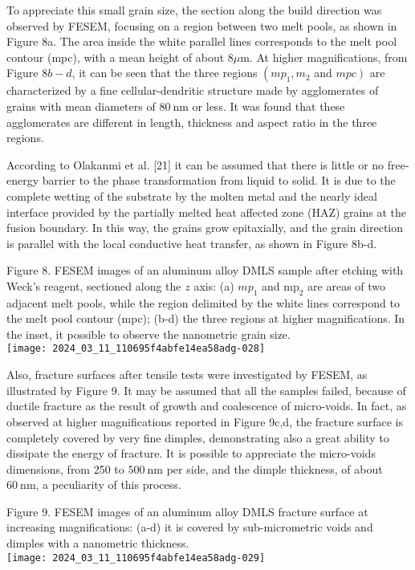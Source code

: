 \documentclass[10pt]{article}
\begin{document}
To appreciate this small grain size, the section along the build direction was observed by FESEM, focusing on a region between two melt pools, as shown in Figure 8a. The area inside the white parallel lines corresponds to the melt pool contour (mpc), with a mean height of about $8 \mu \mathrm{m}$. At higher magnifications, from Figure $8 b-d$, it can be seen that the three regions $\left(m p_{1}, m_{2}\right.$ and $\left.m p c\right)$ are characterized by a fine cellular-dendritic structure made by agglomerates of grains with mean diameters of $80 \mathrm{~nm}$ or less. It was found that these agglomerates are different in length, thickness and aspect ratio in the three regions.

According to Olakanmi et al. [21] it can be assumed that there is little or no free-energy barrier to the phase transformation from liquid to solid. It is due to the complete wetting of the substrate by the molten metal and the nearly ideal interface provided by the partially melted heat affected zone (HAZ) grains at the fusion boundary. In this way, the grains grow epitaxially, and the grain direction is parallel with the local conductive heat transfer, as shown in Figure 8b-d.

Figure 8. FESEM images of an aluminum alloy DMLS sample after etching with Weck's reagent, sectioned along the $z$ axis: (a) $m p_{1}$ and $\mathrm{mp}_{2}$ are areas of two adjacent melt pools, while the region delimited by the white lines correspond to the melt pool contour (mpc); (b-d) the three regions at higher magnifications. In the inset, it possible to observe the nanometric grain size.\\
\texttt{[image: 2024\_03\_11\_110695f4abfe14ea58adg-028]}

Also, fracture surfaces after tensile tests were investigated by FESEM, as illustrated by Figure 9. It may be assumed that all the samples failed, because of ductile fracture as the result of growth and coalescence of micro-voids. In fact, as observed at higher magnifications reported in Figure 9c,d, the fracture surface is completely covered by very fine dimples, demonstrating also a great ability to\\
dissipate the energy of fracture. It is possible to appreciate the micro-voids dimensions, from 250 to $500 \mathrm{~nm}$ per side, and the dimple thickness, of about $60 \mathrm{~nm}$, a peculiarity of this process.

Figure 9. FESEM images of an aluminum alloy DMLS fracture surface at increasing magnifications: (a-d) it is covered by sub-micrometric voids and dimples with a nanometric thickness.\\
\texttt{[image: 2024\_03\_11\_110695f4abfe14ea58adg-029]}
\end{document}
